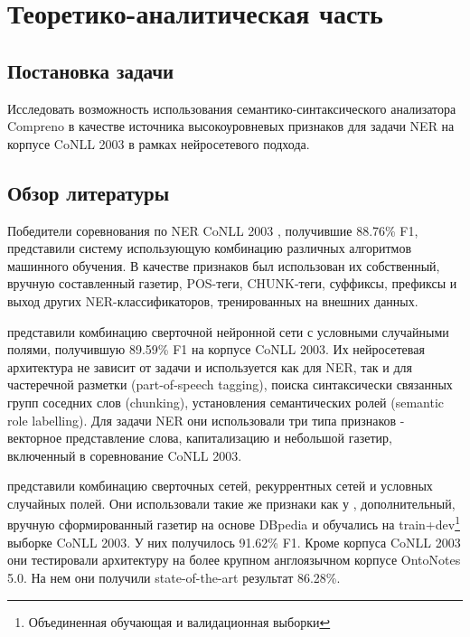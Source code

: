 \chapter{Теоретико-аналитическая часть}

  \section{Постановка задачи}

    Исследовать возможность использования семантико-синтаксического
    анализатора Compreno в качестве источника высокоуровневых признаков для задачи
    NER на корпусе CoNLL 2003 в рамках нейросетевого подхода.

  \section{Обзор литературы}

    Победители соревнования по NER CoNLL 2003 \citep{florian2003named}, получившие 88.76\% F1,
    представили систему использующую комбинацию различных алгоритмов машинного обучения.
    В качестве признаков был использован их собственный, вручную составленный газетир,
    POS-теги, CHUNK-теги, суффиксы, префиксы и выход других NER-классификаторов,
    тренированных на внешних данных.

    \citep{collobert2011natural} представили комбинацию сверточной нейронной сети
    с условными случайными полями, получившую 89.59\% F1 на корпусе CoNLL 2003.
    Их нейросетевая архитектура не зависит от задачи и используется как для NER, так и для
    частеречной разметки (part-of-speech tagging), поиска синтаксически связанных групп
    соседних слов (chunking), установления семантических ролей (semantic role labelling).
    Для задачи NER они использовали три типа признаков - векторное представление слова,
    капитализацию и небольшой газетир, включенный в соревнование CoNLL 2003.

    \citep{chiu2015named} представили комбинацию сверточных сетей, рекуррентных сетей
    и условных случайных полей.
    Они использовали такие же признаки как у \citep{collobert2011natural}, дополнительный, вручную сформированный
    газетир на основе DBpedia и обучались на
    train+dev\footnote{Объединенная обучающая и валидационная выборки} выборке CoNLL 2003.
    У них получилось 91.62\% F1. Кроме корпуса CoNLL 2003 они тестировали архитектуру
    на более крупном англоязычном корпусе OntoNotes 5.0. На нем они получили
    state-of-the-art результат 86.28\%.

